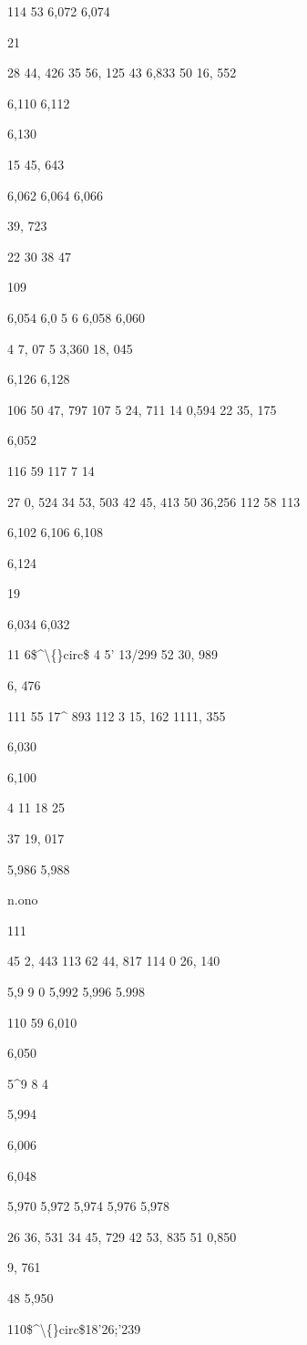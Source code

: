 \documentclass[10pt,a4paper]{article}
\begin{document}
114 53
6,072
6,074

21

28 44, 426
35 56, 125
43 6,833
50 16, 552

6,110
6,112

6,130

15 45, 643

6,062
6,064
6,066

39, 723

22
30
38
47

109

6,054
6,0 5 6
6,058
6,060

4 7, 07 5
3,360
18, 045

6,126
6,128

106 50 47, 797
107 5 24, 711
14 0,594
22 35, 175

6,052

116 59
117 7
14

27 0, 524
34 53, 503
42 45, 413
50 36,256
112 58
113

6,102
6,106
6,108

6,124

19

6,034
6,032

11 6\$\textasciicircum{}\textbackslash\{\}circ\$ 4 5' 13/299
52 30, 989

6, 476

111 55 17\textasciicircum{} 893
112 3 15, 162
1111, 355

6,030

6,100

4
11
18
25

37 19, 017

5,986
5,988

n.ono

111

45 2, 443
113 62 44, 817
114 0 26, 140

5,9 9 0
5,992
5,996
5.998

110 59
6,010

6,050

5\textasciicircum{}9 8 4

5,994

6,006

6,048

5,970
5,972
5,974
5,976
5,978

26 36, 531
34 45, 729
42 53, 835
51
0,850

9, 761

48
5,950

110\$\textasciicircum{}\textbackslash\{\}circ\$18'26;'239
\end{document}

